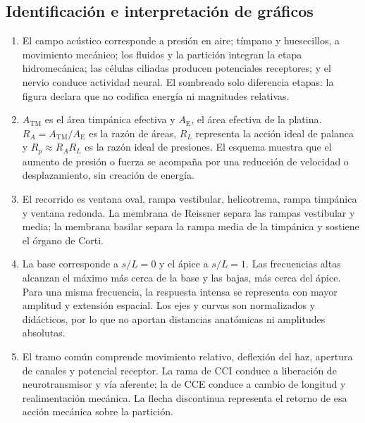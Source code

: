 \subsection*{Identificación e interpretación de gráficos}

\begin{enumerate}[label=\textbf{I\arabic*.},leftmargin=*]
    \item El campo acústico corresponde a presión en aire; tímpano y
    huesecillos, a movimiento mecánico; los fluidos y la partición integran la
    etapa hidromecánica; las células ciliadas producen potenciales receptores;
    y el nervio conduce actividad neural. El sombreado solo diferencia
    etapas: la figura declara que no codifica energía ni magnitudes relativas.

    \item \(A_\mathrm{TM}\) es el área timpánica efectiva y
    \(A_\mathrm{E}\), el área efectiva de la platina.
    \(R_A=A_\mathrm{TM}/A_\mathrm{E}\) es la razón de áreas,
    \(R_L\) representa la acción ideal de palanca y
    \(R_p\approx R_A R_L\) es la razón ideal de presiones. El esquema muestra
    que el aumento de presión o fuerza se acompaña por una reducción de
    velocidad o desplazamiento, sin creación de energía.

    \item El recorrido es ventana oval, rampa vestibular, helicotrema, rampa
    timpánica y ventana redonda. La membrana de Reissner separa las rampas
    vestibular y media; la membrana basilar separa la rampa media de la
    timpánica y sostiene el órgano de Corti.

    \item La base corresponde a \(s/L=0\) y el ápice a \(s/L=1\). Las
    frecuencias altas alcanzan el máximo más cerca de la base y las bajas, más
    cerca del ápice. Para una misma frecuencia, la respuesta intensa se
    representa con mayor amplitud y extensión espacial. Los ejes y curvas son
    normalizados y didácticos, por lo que no aportan distancias anatómicas ni
    amplitudes absolutas.

    \item El tramo común comprende movimiento relativo, deflexión del haz,
    apertura de canales y potencial receptor. La rama de CCI conduce a
    liberación de neurotransmisor y vía aferente; la de CCE conduce a cambio
    de longitud y realimentación mecánica. La flecha discontinua representa el
    retorno de esa acción mecánica sobre la partición.
\end{enumerate}

